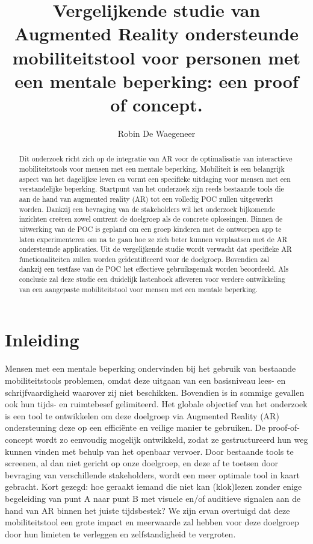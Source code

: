 \documentclass{hogent-article}
\title{Vergelijkende studie van Augmented Reality ondersteunde mobiliteitstool voor personen met een mentale beperking: een proof of concept.}
\author{Robin De Waegeneer}
\begin{document}
  \begin{abstract}
    Dit onderzoek richt zich op de integratie van AR voor de optimalisatie van interactieve mobiliteitstools voor mensen met een mentale beperking. 
    Mobiliteit is een belangrijk aspect van het dagelijkse leven en vormt een specifieke uitdaging voor mensen met een verstandelijke beperking. 
    Startpunt van het onderzoek zijn reeds bestaande tools die aan de hand van augmented reality (AR) tot een volledig POC zullen uitgewerkt worden. 
    Dankzij een bevraging van de stakeholders wil het onderzoek bijkomende inzichten creëren zowel omtrent de doelgroep als de concrete oplossingen. 
    Binnen de uitwerking van de POC is gepland om een groep kinderen met de ontworpen app te laten experimenteren om na te gaan hoe ze zich beter kunnen verplaatsen met de AR ondersteunde applicaties. 
    Uit de vergelijkende studie wordt verwacht dat specifieke AR functionaliteiten zullen worden geïdentificeerd voor de doelgroep. 
    Bovendien zal dankzij een testfase van de POC het effectieve gebruiksgemak worden beoordeeld. Als conclusie zal deze studie een duidelijk lastenboek afleveren voor verdere ontwikkeling van een aangepaste mobiliteitstool voor mensen met een mentale beperking.
  \end{abstract}

\tableofcontents

\bigskip

\section{Inleiding}%
    \label{sec:inleiding}
    
    Mensen met een mentale beperking ondervinden bij het gebruik van bestaande mobiliteitstools problemen, omdat deze uitgaan van een basisniveau lees- en schrijfvaardigheid waarover zij niet beschikken. 
    Bovendien is in sommige gevallen ook hun tijds- en ruimtebesef gelimiteerd. 
    Het globale objectief van het onderzoek is een tool te ontwikkelen om deze doelgroep via Augmented Reality (AR) ondersteuning deze op een efficiënte en veilige manier te gebruiken. 
    De proof-of-concept wordt zo eenvoudig mogelijk ontwikkeld, zodat ze gestructureerd hun weg kunnen vinden met behulp van het openbaar vervoer. 
    Door bestaande tools te screenen, al dan niet gericht op onze doelgroep, en deze af te toetsen door bevraging van verschillende stakeholders, wordt een meer optimale tool in kaart gebracht. 
    Kort gezegd: hoe geraakt iemand die niet kan (klok)lezen zonder enige begeleiding van punt A naar punt B met visuele en/of auditieve signalen aan de hand van AR binnen het juiste tijdsbestek?
    We zijn ervan overtuigd dat deze mobiliteitstool een grote impact en meerwaarde zal hebben voor deze doelgroep door hun limieten te verleggen en zelfstandigheid te vergroten.
    
\end{document}
